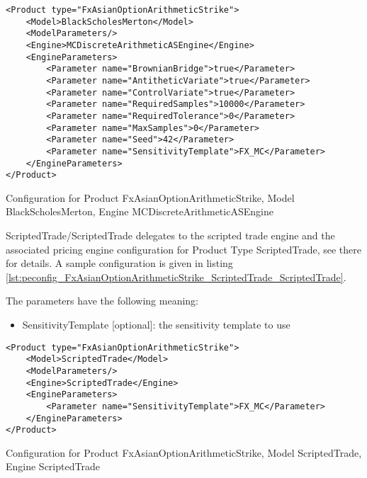 \begin{longlisting}
\begin{verbatim}
<Product type="FxAsianOptionArithmeticStrike">
    <Model>BlackScholesMerton</Model>
    <ModelParameters/>
    <Engine>MCDiscreteArithmeticASEngine</Engine>
    <EngineParameters>
        <Parameter name="BrownianBridge">true</Parameter>    
        <Parameter name="AntitheticVariate">true</Parameter>    
        <Parameter name="ControlVariate">true</Parameter>    
        <Parameter name="RequiredSamples">10000</Parameter>    
        <Parameter name="RequiredTolerance">0</Parameter>    
        <Parameter name="MaxSamples">0</Parameter>    
        <Parameter name="Seed">42</Parameter>    
        <Parameter name="SensitivityTemplate">FX_MC</Parameter>
    </EngineParameters>
</Product>
\end{verbatim}
\caption{Configuration for Product FxAsianOptionArithmeticStrike, Model BlackScholesMerton, Engine MCDiscreteArithmeticASEngine}
\label{lst:peconfig_FxAsianOptionArithmeticStrike_BlackScholesMerton_MCDiscreteArithmeticASEngine}
\end{longlisting}

ScriptedTrade/ScriptedTrade delegates to the scripted trade engine and the associated pricing engine configuration for
Product Type ScriptedTrade, see there for details. A sample configuration is given in listing
\ref{lst:peconfig_FxAsianOptionArithmeticStrike_ScriptedTrade_ScriptedTrade}.

The parameters have the following meaning:

\begin{itemize}
\item SensitivityTemplate [optional]: the sensitivity template to use 
\end{itemize}

\begin{longlisting}
\begin{verbatim}
<Product type="FxAsianOptionArithmeticStrike">
    <Model>ScriptedTrade</Model>
    <ModelParameters/>
    <Engine>ScriptedTrade</Engine>
    <EngineParameters>
        <Parameter name="SensitivityTemplate">FX_MC</Parameter>
    </EngineParameters>
</Product>
\end{verbatim}
\caption{Configuration for Product FxAsianOptionArithmeticStrike, Model ScriptedTrade, Engine ScriptedTrade}
\label{lst:peconfig_FxAsianOptionArithmeticStrike_ScriptedTrade_ScriptedTrade}
\end{longlisting}

